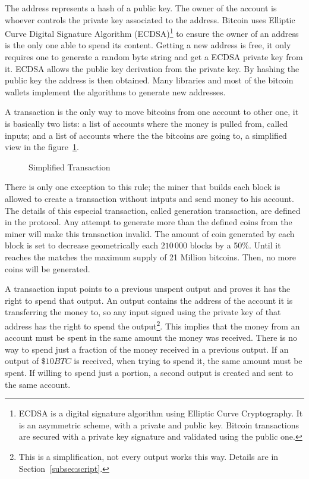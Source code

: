 The address represents a hash of a public key. The owner of the account is
  whoever controls the private key associated to the address.
Bitcoin uses Elliptic Curve Digital Signature Algorithm (ECDSA)\footnote{%
  ECDSA is a digital signature algorithm using Elliptic Curve
    Cryptography. It is an asymmetric scheme, with a private and public key.
    Bitcoin transactions are secured with a private key signature and validated
    using the public one.} to ensure the owner of an address is the only one able
  to spend its content.
Getting a new address is free, it only requires one to generate a random byte
  string and get a ECDSA private key from it. ECDSA allows the public key
  derivation from the private key.
By hashing the public key the address is then obtained.
Many libraries and most of the bitcoin wallets implement the algorithms to
  generate new addresses.

A transaction is the only way to move bitcoins from one account to other one,
  it is basically two lists:
  a list of accounts where the money is pulled from, called inputs; and a list
  of accounts where the the bitcoins are going to, a simplified
  view in the figure~\ref{fig:simplified_transaction}.

\begin{figure}
	\centering
	
	\caption{Simplified Transaction}
	\label{fig:simplified_transaction}
\end{figure}

There is only one exception to this rule; the miner that builds each block is
  allowed to create a transaction without intputs and send money to his account.
The details of this especial transaction, called generation transaction, are
  defined in the protocol.
Any attempt to generate more than the defined coins from the miner will make
  this transaction invalid.
The amount of coin generated by each block is set to decrease geometrically
  each $210\,000$ blocks by a 50\%.
Until it reaches the matches the maximum supply of 21 Million bitcoins.
Then, no more coins will be generated.

A transaction input points to a previous unspent output and proves it has the
  right to spend that output.
An output contains the address of the account it is transferring the money to,
  so any input signed using the private key of that address has the right to
  spend the output\footnote{This is a simplification, not every output works
  this way. Details are in Section~\ref{subsec:script}.}.
This implies that the money from an account must be spent in the same amount
  the money was received. There is no way to spend just a fraction of the money
  received in a previous output. If an output of $\$ 10BTC$ is received, when
  trying to spend it, the same amount must be spent. If willing to spend just a
  portion, a second output is created and sent to the same account.

